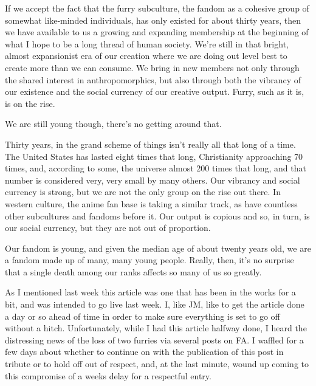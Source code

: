 
If we accept the fact that the furry subculture, the fandom as a cohesive group of somewhat like-minded individuals, has only existed for about thirty years, then we have available to us a growing and expanding membership at the beginning of what I hope to be a long thread of human society. We're still in that bright, almost expansionist era of our creation where we are doing out level best to create more than we can consume. We bring in new members not only through the shared interest in anthropomorphics, but also through both the vibrancy of our existence and the social currency of our creative output. Furry, such as it is, is on the rise.

We are still young though, there's no getting around that.

Thirty years, in the grand scheme of things isn't really all that long of a time. The United States has lasted eight times that long, Christianity approaching 70 times, and, according to some, the universe almost 200 times that long, and that number is considered very, very small by many others. Our vibrancy and social currency is strong, but we are not the only group on the rise out there. In western culture, the anime fan base is taking a similar track, as have countless other subcultures and fandoms before it. Our output is copious and so, in turn, is our social currency, but they are not out of proportion.

Our fandom is young, and given the median age of about twenty years old, we are a fandom made up of many, many young people. Really, then, it's no surprise that a single death among our ranks affects so many of us so greatly.

As I mentioned last week this article was one that has been in the works for a bit, and was intended to go live last week. I, like JM, like to get the article done a day or so ahead of time in order to make sure everything is set to go off without a hitch. Unfortunately, while I had this article halfway done, I heard the distressing news of the loss of two furries via several posts on FA. I waffled for a few days about whether to continue on with the publication of this post in tribute or to hold off out of respect, and, at the last minute, wound up coming to this compromise of a weeks delay for a respectful entry.

